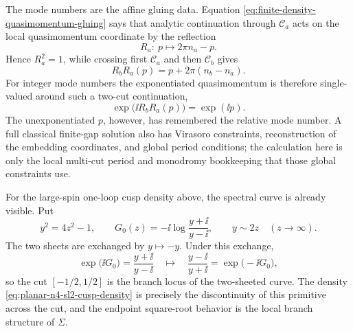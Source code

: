 The mode numbers are the affine gluing data.  Equation
\eqref{eq:finite-density-quasimomentum-gluing} says that analytic continuation
through \(\mathcal C_a\) acts on the local quasimomentum coordinate by the
reflection
\begin{equation}
  R_a:\ p\longmapsto 2\pi n_a-p .
  \label{eq:finite-density-cut-reflection}
\end{equation}
Hence \(R_a^2=1\), while crossing first \(\mathcal C_a\) and then
\(\mathcal C_b\) gives
\begin{equation}
  R_bR_a(p)=p+2\pi(n_b-n_a).
  \label{eq:finite-density-two-cut-monodromy}
\end{equation}
For integer mode numbers the exponentiated quasimomentum is therefore
single-valued around such a two-cut continuation,
\[
  \exp\bigl(\ii R_bR_a(p)\bigr)=\exp(\ii p).
\]
The unexponentiated \(p\), however, has remembered the relative mode number.
A full classical finite-gap solution also has Virasoro constraints,
reconstruction of the embedding coordinates, and global period conditions;
the calculation here is only the local multi-cut period and monodromy
bookkeeping that those global constraints use.

For the large-spin one-loop cusp density above, the spectral curve is already
visible.  Put
\[
  y^2=4z^2-1,
  \qquad
  G_0(z)
  =
  -\ii
  \log\frac{y+\ii}{y-\ii},
  \qquad y\sim2z\quad(z\to\infty).
\]
The two sheets are exchanged by \(y\mapsto -y\).  Under this exchange,
\[
  \exp\!\bigl(\ii G_0\bigr)
  =
  \frac{y+\ii}{y-\ii}
  \quad\longmapsto\quad
  \frac{y-\ii}{y+\ii}
  =
  \exp\!\bigl(-\ii G_0\bigr),
\]
so the cut \([-1/2,1/2]\) is the branch locus of the two-sheeted curve.  The
density \eqref{eq:planar-n4-sl2-cusp-density} is precisely the discontinuity
of this primitive across the cut, and the endpoint square-root behavior is
the local branch structure of \(\Sigma\).

